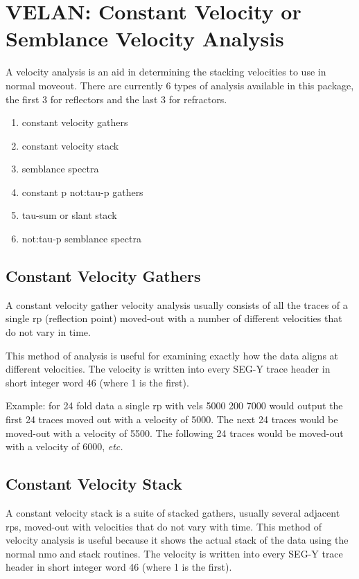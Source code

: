 \section{VELAN: Constant Velocity or Semblance Velocity Analysis}
\label{cmd_velan}

A velocity analysis is an aid in determining the stacking velocities to
use in normal moveout.  There are currently 6 types of analysis
available in this package, the first 3 for reflectors and the last 3
for refractors.
\begin{enumerate}
\item constant velocity \glspl{gather}
\item constant velocity stack
\item semblance spectra
\item constant p \gls{not:tau}-p \glspl{gather}
\item tau-sum or slant stack
\item \gls{not:tau}-p semblance spectra
\end{enumerate}

\subsection{Constant Velocity Gathers}

A constant velocity \gls{gather} velocity analysis usually consists of all
the traces of a single \gls{rp} (reflection point) moved-out with a number of
different velocities that do not vary in time.

This method of analysis is useful for examining exactly how the data
aligns at different velocities.  The velocity is written into every
SEG-Y trace header in short integer word 46 (where 1 is the first).

Example: for 24 fold data a single \gls{rp} with vels 5000 200 7000 would
output the first 24 traces moved out with a velocity of 5000.  The next
24 traces would be moved-out with a velocity of 5500. The following 24
traces would be moved-out with a velocity of 6000, \textit{etc.}

\subsection{Constant Velocity Stack}

A constant velocity stack is a suite of stacked \glspl{gather}, usually several
adjacent \glspl{rp}, moved-out with velocities that do not vary with time.
This method of velocity analysis is useful because it shows the actual
stack of the data using the normal nmo and stack routines.  The velocity
is written into every SEG-Y trace header in short integer word 46
(where 1 is the first).

